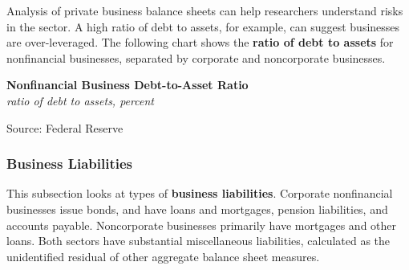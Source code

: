 \documentclass{report}
\makeatletter
\newcommand{\tbllink}[1]{\href{https://raw.githubusercontent.com/bdecon/US-chartbook/master/chartbook/data/#1}{\faTable}}
\newcommand*\short[1]{\expandafter\@gobbletwo\number\numexpr#1\relax}
\newcommand{\absnode}[3]{\node[below right, align=left] at (axis cs: #1,#2) {#3};}
\newcommand{\shdateaxisticks}{
		date coordinates in=x, axis line style={draw=none},
		xmax={2024-01-31},
		max space between ticks=40,	    
		xtick={{1990-01-01}, {1995-01-01}, {2000-01-01}, 
			{2005-01-01}, {2010-01-01}, {2015-01-01}, {2020-01-01}},
		minor xtick={},
		enlarge y limits={0.06}, enlarge x limits={0.01},
		xticklabel style={align=center, yshift=-2pt}, tick label style={inner sep=0pt},
		}
\newcommand{\thickline}[4]{\addplot[ultra thick, no markers, color=#1] 
		table [x=#2, y=#3, col sep=comma] {#4};	}
\newcommand{\rbars}{
		\fill[color=black!10] (axis cs:{1990-07-01},\pgfkeysvalueof{/pgfplots/ymin})
			rectangle (axis cs:{1991-03-01}, \pgfkeysvalueof{/pgfplots/ymax});
		\fill[color=black!10] (axis cs:{2007-12-01},\pgfkeysvalueof{/pgfplots/ymin})
			rectangle (axis cs:{2009-07-01}, \pgfkeysvalueof{/pgfplots/ymax});
		\fill[color=black!10] (axis cs:{2001-03-01},\pgfkeysvalueof{/pgfplots/ymin})
			rectangle (axis cs:{2001-11-01}, \pgfkeysvalueof{/pgfplots/ymax});
		\fill[color=black!10] (axis cs:{2020-02-01},\pgfkeysvalueof{/pgfplots/ymin})
			rectangle (axis cs:{2020-05-01}, \pgfkeysvalueof{/pgfplots/ymax});}
\makeatother
\begin{document}
{\begin{minipage}{1.0\textwidth}
\small Analysis of private business balance sheets can help researchers understand risks in the sector. A high ratio of debt to assets, for example, can suggest businesses are over-leveraged. The following chart shows the \textbf{ratio of debt to assets} for nonfinancial businesses, separated by corporate and noncorporate businesses. 
\end{minipage}
\vspace{1mm}

\begin{minipage}{0.43\textwidth}
\normalsize \textbf{Nonfinancial Business Debt-to-Asset Ratio}\\
\footnotesize{\textit{ratio of debt to assets, percent}}
\vspace{2.5cm}

\hspace{3mm}

\footnotesize{Source: Federal Reserve} \hfill \tbllink{bus_bs_sh.csv}
\end{minipage} \hspace{5mm} \begin{minipage}{0.29\textwidth}
\small 
\end{minipage}
\newpage
\vspace*{-10mm}

\begin{minipage}{1.0\textwidth}    
\subsubsection*{Business Liabilities} 
\small This subsection looks at types of \textbf{business liabilities}. Corporate nonfinancial businesses issue bonds, and have loans and mortgages, pension liabilities, and accounts payable. Noncorporate businesses primarily have mortgages and other loans. Both sectors have substantial miscellaneous liabilities, calculated as the unidentified residual of other aggregate balance sheet measures. 
\end{minipage}

}
\end{document}
